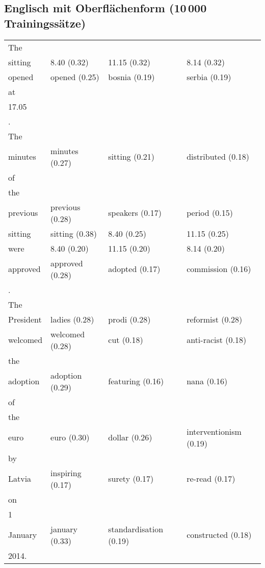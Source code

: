 \documentclass[11pt,twoside,openright]{mpreport}
\begin{document}
\subsection{Englisch mit Oberflächenform (10\,000 Trainingssätze)}
\hspace{-0cm}\begin{footnotesize}\begin{tabular}{|llll|}
\hline
The & & & \\
sitting                 & 8.40 (0.32) & 11.15 (0.32) & 8.14 (0.32) \\
opened                  & opened (0.25) & bosnia (0.19) & serbia (0.19) \\
at & & & \\
17.05 & & & \\
. & & & \\
The & & & \\
minutes                 & minutes (0.27) & sitting (0.21) & distributed (0.18) \\
of & & & \\
the & & & \\
previous                & previous (0.28) & speakers (0.17) & period (0.15) \\
sitting                 & sitting (0.38) & 8.40 (0.25) & 11.15 (0.25) \\
were                    & 8.40 (0.20) & 11.15 (0.20) & 8.14 (0.20) \\
approved                & approved (0.28) & adopted (0.17) & commission (0.16) \\
. & & & \\
The & & & \\
President               & ladies (0.28) & prodi (0.28) & reformist (0.28) \\
welcomed                & welcomed (0.28) & cut (0.18) & anti-racist (0.18) \\
the & & & \\
adoption                & adoption (0.29) & featuring (0.16) & nana (0.16) \\
of & & & \\
the & & & \\
euro                    & euro (0.30) & dollar (0.26) & interventionism (0.19) \\
by & & & \\
Latvia                  & inspiring (0.17) & surety (0.17) & re-read (0.17) \\
on & & & \\
1 & & & \\
January                 & january (0.33) & standardisation (0.19) & constructed (0.18) \\
2014. & & & \\
\hline
\end{tabular}\end{footnotesize}\\
\end{document}
